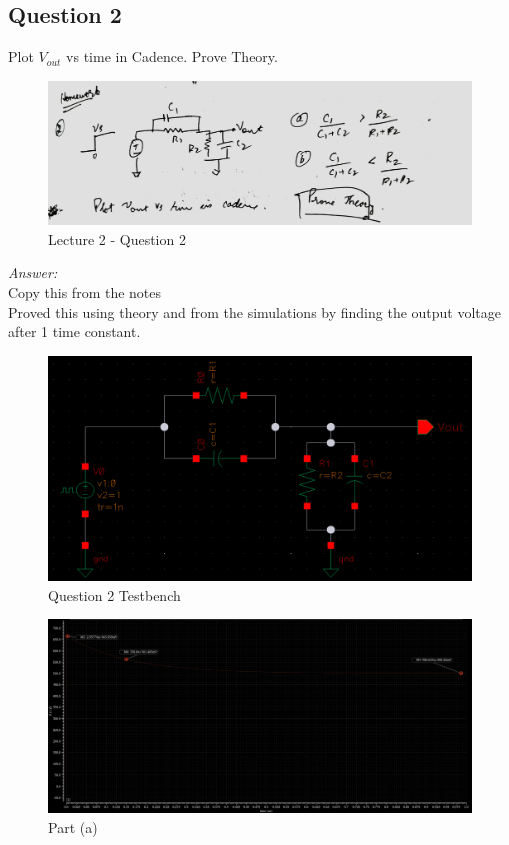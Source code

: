 \documentclass[a4paper]{article}
\begin{document}
\subsection{Question 2}
Plot $V_{out}$ vs time in Cadence. Prove Theory. \\
\begin{figure}
    \centering
    \includegraphics[width=0.8\linewidth]{images/Lec_2_Q_2.jpeg}
    \caption{Lecture 2 - Question 2}
\end{figure}
\textit{Answer:}\\
Copy this from the notes\\
Proved this using theory and from the simulations  by finding the output voltage after 1 time constant.

\begin{figure}
    \centering
    \includegraphics[width=1\linewidth]{images/Lec_2_Q_2_testbench.png}
    \caption{Question 2 Testbench}
\end{figure}

\begin{figure}
    \centering
    \includegraphics[width=1\linewidth]{images/Lec_2_Q_2_a.png}
    \caption{Part (a)}
\end{figure}
\end{document}
